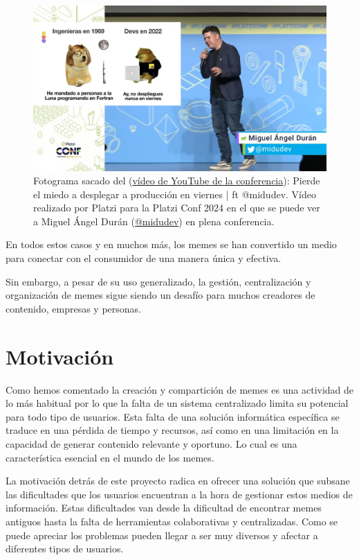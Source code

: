 \begin{figure}[ht]
    \caption{Fotograma sacado del (\href{http://sl.ugr.es/0dXQ}{vídeo de YouTube de la conferencia}): Pierde el miedo a desplegar a producción en viernes | ft @midudev. Vídeo realizado por Platzi para la Platzi Conf 2024 en el que se puede ver a Miguel Ángel Durán (\href{https://midu.dev/}{@midudev}) en plena conferencia.}
    \centering
    \vspace*{0.5cm}
    \includegraphics[scale=0.15]{figuras/platziconfmidudev.png}
\end{figure}

En todos estos casos y en muchos más, los memes se han convertido un medio para conectar con el consumidor de una manera única y efectiva.

Sin embargo, a pesar de su uso generalizado, la gestión, centralización y organización de memes sigue siendo un desafío para muchos creadores de contenido, empresas y personas.

\section{Motivación}

Como hemos comentado la creación y compartición de memes es una actividad de lo más habitual por lo que la falta de un sistema centralizado limita su potencial para todo tipo de usuarios. Esta falta de una solución informática específica se traduce en una pérdida de tiempo y recursos, así como en una limitación en la capacidad de generar contenido relevante y oportuno. Lo cual es una característica esencial en el mundo de los memes.

La motivación detrás de este proyecto radica en ofrecer una solución que subsane las dificultades que los usuarios encuentran a la hora de gestionar estos medios de información. Estas dificultades van desde la dificultad de encontrar memes antiguos hasta la falta de herramientas colaborativas y centralizadas. Como se puede apreciar los problemas pueden llegar a ser muy diversos y afectar a diferentes tipos de usuarios.


